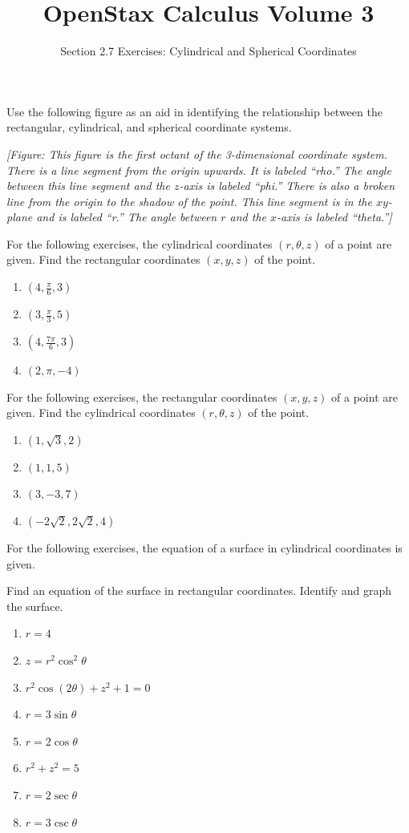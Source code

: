 \documentclass{exercises}
\title{OpenStax Calculus Volume 3}
\subtitle{Section 2.7 Exercises: Cylindrical and Spherical Coordinates}
\author{}
\date{}
\begin{document}
\maketitle


Use the following figure as an aid in identifying the relationship between the rectangular, cylindrical, and spherical coordinate systems.


\textit{[Figure: This figure is the first octant of the 3-dimensional coordinate system. There is a line segment from the origin upwards. It is labeled ``rho.'' The angle between this line segment and the $z$-axis is labeled ``phi.'' There is also a broken line from the origin to the shadow of the point. This line segment is in the $xy$-plane and is labeled ``r.'' The angle between $r$ and the $x$-axis is labeled ``theta.'']}


For the following exercises, the cylindrical coordinates $(r,\theta,z)$ of a point are given. Find the rectangular coordinates $(x,y,z)$ of the point.

\begin{enumerate}[start=1]
\item $(4,\frac{\pi}{6},3)$
\item $(3,\frac{\pi}{3},5)$
\item $(4,\frac{7\pi}{6},3)$
\item $(2,\pi,-4)$
\end{enumerate}

For the following exercises, the rectangular coordinates $(x,y,z)$ of a point are given. Find the cylindrical coordinates $(r,\theta,z)$ of the point.

\begin{enumerate}[resume]
\item $(1,\sqrt{3},2)$
\item $(1,1,5)$
\item $(3,-3,7)$
\item $(-2\sqrt{2},2\sqrt{2},4)$
\end{enumerate}

For the following exercises, the equation of a surface in cylindrical coordinates is given.


Find an equation of the surface in rectangular coordinates. Identify and graph the surface.

\begin{enumerate}[resume]
\item \techrequired $r=4$
\item \techrequired $z=r^{2}\cos^{2}\theta$
\item \techrequired $r^{2}\cos(2\theta)+z^{2}+1=0$
\item \techrequired $r=3\sin \theta$
\item \techrequired $r=2\cos \theta$
\item \techrequired $r^{2}+z^{2}=5$
\item \techrequired $r=2\sec \theta$
\item \techrequired $r=3\csc \theta$
\end{enumerate}
\end{document}
